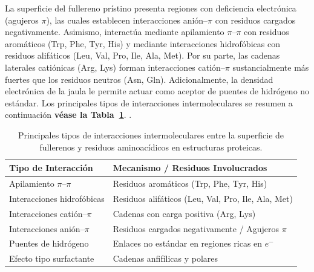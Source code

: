 La superficie del fullereno prístino presenta regiones con deficiencia electrónica (agujeros $\pi$), las cuales establecen interacciones anión--$\pi$ con residuos cargados negativamente. Asimismo, interactúa mediante apilamiento $\pi$--$\pi$ con residuos aromáticos (Trp, Phe, Tyr, His) y mediante interacciones hidrofóbicas con residuos alifáticos (Leu, Val, Pro, Ile, Ala, Met). Por su parte, las cadenas laterales catiónicas (Arg, Lys) forman interacciones catión--$\pi$ sustancialmente más fuertes que los residuos neutros (Asn, Gln). Adicionalmente, la densidad electrónica de la jaula le permite actuar como aceptor de puentes de hidrógeno no estándar. %
 Los principales tipos de interacciones intermoleculares se resumen a continuación \textbf{véase la Tabla~\ref{tab:interacciones_fullereno}}. \cite{bolshakova2023facile}.

\begin{table}[H]
\centering
\caption{Principales tipos de interacciones intermoleculares entre la superficie de fullerenos y residuos aminoacídicos en estructuras proteicas.}
\label{tab:interacciones_fullereno}
\begin{tabular}{l l}
\toprule
\textbf{Tipo de Interacción} & \textbf{Mecanismo / Residuos Involucrados} \\
\midrule
Apilamiento $\pi$--$\pi$ & Residuos aromáticos (Trp, Phe, Tyr, His) \\
Interacciones hidrofóbicas & Residuos alifáticos (Leu, Val, Pro, Ile, Ala, Met) \\
Interacciones catión--$\pi$ & Cadenas con carga positiva (Arg, Lys) \\
Interacciones anión--$\pi$ & Residuos cargados negativamente / Agujeros $\pi$ \\
Puentes de hidrógeno & Enlaces no estándar en regiones ricas en $e^-$ \\
Efecto tipo surfactante & Cadenas anfifílicas y polares \\
\bottomrule
\end{tabular}
\end{table}

